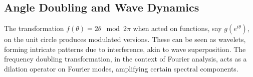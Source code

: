 \documentclass{article}
\begin{document}
\subsection*{Angle Doubling and Wave Dynamics}
The transformation \( f(\theta) = 2\theta \mod 2\pi \) when acted on functions, say \( g(e^{i\theta}) \), on the unit circle produces modulated versions. These can be seen as wavelets, forming intricate patterns due to interference, akin to wave superposition. The frequency doubling transformation, in the context of Fourier analysis, acts as a dilation operator on Fourier modes, amplifying certain spectral components.
\end{document}
